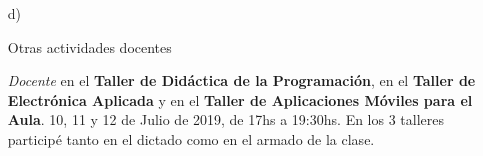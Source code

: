 \begin{enumerate}[leftmargin=0.8cm]
  \item[d)]{Otras actividades docentes

    \begin{itemize}[leftmargin=0.2cm]

      {\emph{Docente} en el \textbf{Taller de Didáctica de la Programación}, en el \textbf{Taller de Electrónica Aplicada} y
        en el \textbf{Taller de Aplicaciones Móviles para el Aula}.}
      {10, 11 y 12 de Julio de 2019, de 17hs a 19:30hs.}
      {En los 3 talleres participé tanto en el dictado como en el armado de la clase.}

    \end{itemize}
  }

\end{enumerate}
